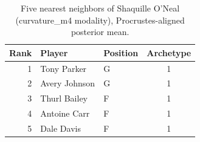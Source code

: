 \begin{table}[htbp]
  \centering\small
  \begin{tabular}{rllc}
    \toprule
    Rank & Player & Position & Archetype \\
    \midrule
    1 & Tony Parker & G & 1 \\
    2 & Avery Johnson & G & 1 \\
    3 & Thurl Bailey & F & 1 \\
    4 & Antoine Carr & F & 1 \\
    5 & Dale Davis & F & 1 \\
    \bottomrule
  \end{tabular}
  \caption{Five nearest neighbors of Shaquille O'Neal (curvature_m4 modality), Procrustes-aligned posterior mean.}
  \label{tab:Shaquille_O_Neal_neighbors_curvature_m4}
\end{table}


